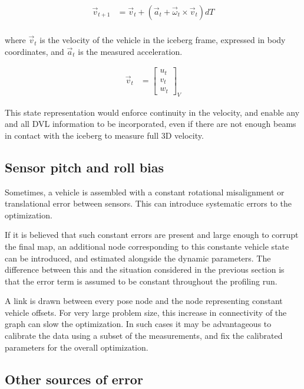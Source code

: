 \begin{align}
\vec{v}_{t+1} &= \vec{v}_t + \left( \vec{a}_t + \vec{\omega}_t \times \vec{v}_t \right)dT\\
\end{align}

where $\vec{v}_t$ is the velocity of the vehicle in the iceberg frame, expressed in body coordinates, and $\vec{a}_t$ is the measured acceleration.
 
\begin{align}
\vec{v}_{t} &=  \left[\begin{array}{c}
                     u_t \\ v_t \\ w_t
                     \end{array}\right]_V
\end{align}

This state representation would enforce continuity in the velocity, and enable any and all DVL information to be incorporated, even if there are not enough beams in contact with the iceberg to measure full 3D velocity.

\subsection{Sensor pitch and roll bias}

Sometimes, a vehicle is assembled with a constant rotational misalignment or translational error between sensors. This can introduce systematic errors to the optimization.

If it is believed that such constant errors are present and large enough to corrupt the final map, an additional node corresponding to this constante vehicle state can be introduced, and estimated alongside the dynamic parameters. The difference between this and the situation considered in the previous section is that the error term is assumed to be constant throughout the profiling run. 

A link is drawn between every pose node and the node representing constant vehicle offsets. For very large problem size, this increase in connectivity of the graph can slow the optimization. In such cases it may be advantageous to calibrate the data using a subset of the measurements, and fix the calibrated parameters for the overall optimization. 

\subsection{Other sources of error}

